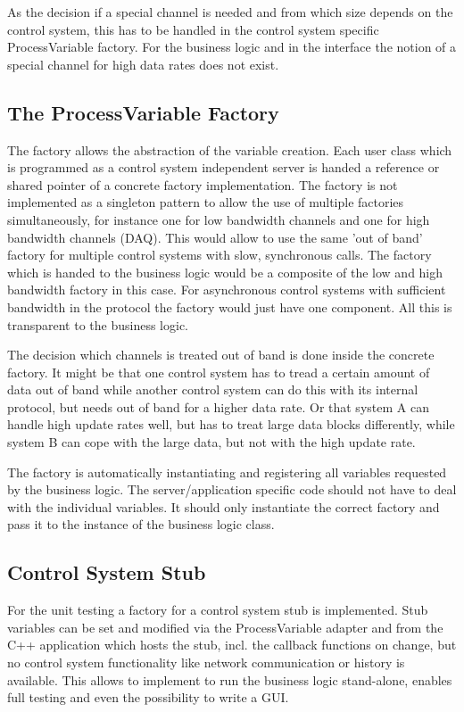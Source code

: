 \documentclass[11pt,a4paper]{scrartcl}
\begin{document}
As the decision if a special channel is needed and from which size depends on
the control system, this has to be handled in the control system specific
ProcessVariable factory. For the business logic and in the interface the
notion of a special channel for high data rates does not exist.

\subsection{The ProcessVariable Factory}

The factory allows the abstraction of the variable creation. Each user class
which is programmed as a control system independent server is handed a
reference or shared pointer of a concrete factory implementation. The factory
is not implemented as a singleton pattern to allow the use of multiple
factories simultaneously, for instance one for low bandwidth channels and one
for high bandwidth channels (DAQ). This would allow to use the same 'out of
band' factory for multiple control systems with slow, synchronous calls. The
factory which is handed to the business logic would be a composite of the low
and high bandwidth factory in this case. 
For asynchronous control systems with sufficient bandwidth in the protocol the
factory would just have one component. All this is transparent to the business
logic.

The decision which channels is treated out of band is done inside the concrete
factory. It might be that one control system has to tread a certain amount of
data out of band while another control system can do this with its internal
protocol, but needs out of band for a higher data rate. Or that system A can
handle high update rates well, but has to treat large data blocks differently,
while system B can cope with the large data, but not with the high update
rate.

The factory is automatically instantiating and registering all variables
requested by the business logic. The server/application specific code should
not have to deal with the individual variables. It should only instantiate the
correct factory and pass it to the instance of the business logic class.

\subsection{Control System Stub}
For the unit testing a factory for a control system stub is implemented.
Stub variables can be set and modified via the ProcessVariable adapter and from
the C++ application which hosts the stub, incl. the callback functions on
change, but no control system functionality like network communication or
history is available. This allows to implement to run the business logic
stand-alone, enables full testing and even the possibility to write a GUI.
\end{document}
